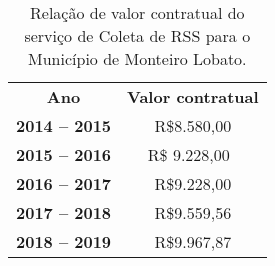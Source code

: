 \begin{table}[htbp]
  \centering
  \caption{Relação de valor contratual do serviço de Coleta de RSS para o Município de Monteiro Lobato.}
    \begin{tabular}{c|c}
    \rowcolor[rgb]{ .969,  .588,  .275} \textcolor[rgb]{ 1,  1,  1}{\textbf{Ano}} & \textcolor[rgb]{ 1,  1,  1}{\textbf{Valor contratual }} \\
    \rowcolor[rgb]{ .984,  .831,  .706} \textbf{2014 – 2015} & R\$8.580,00 \\
    \rowcolor[rgb]{ .992,  .914,  .851} \textbf{2015 – 2016 } & \multicolumn{1}{p{8.785em}}{R\$ 9.228,00 } \\
    \rowcolor[rgb]{ .984,  .831,  .706} \textbf{2016 – 2017 } & R\$9.228,00 \\
    \rowcolor[rgb]{ .992,  .914,  .851} \textbf{2017 – 2018 } & R\$9.559,56 \\
    \rowcolor[rgb]{ .992,  .914,  .851} \textbf{2018 – 2019 } & \cellcolor[rgb]{ .984,  .831,  .706}R\$9.967,87 \\
    \end{tabular}%
  \label{tab:valor_contratual}%
\end{table}%
